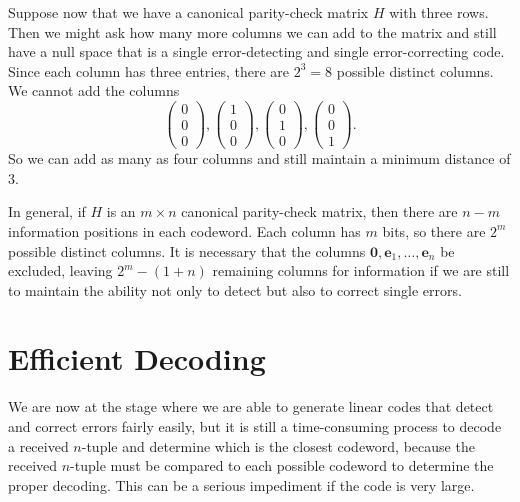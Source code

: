  
\medskip
 
 
Suppose now that we have a canonical parity-check matrix $H$ with
three rows. Then we might ask how many more columns we can add to
the matrix and still have a null space that is a single
error-detecting and single error-correcting code. Since each column
has three entries, there are $2^3 = 8$ possible distinct columns. We
cannot add the columns 
\[
\begin{pmatrix}
 0 \\ 0 \\ 0 
\end{pmatrix},
\begin{pmatrix}
 1 \\ 0 \\ 0 
\end{pmatrix},
\begin{pmatrix}
 0 \\ 1 \\ 0 
 \end{pmatrix},
\begin{pmatrix}
 0 \\ 0 \\ 1 
 \end{pmatrix}.
\]
So we can add as many as four columns and still maintain a minimum
distance of 3. 
 
 
In general, if $H$ is an $m \times n$ canonical parity-check matrix,
then there are $n-m$ information positions in each codeword. Each
column has $m$ bits, so there are $2^m$ possible distinct columns.
It is necessary that the columns ${\mathbf 0}, {\mathbf e}_1, \ldots,
{\mathbf e}_n$ be excluded, leaving $2^m - (1 + n)$ remaining columns for
information if we are still to maintain the ability not only to detect
but also to correct single errors. 
 
 
\section{Efficient Decoding}
 
 
We are now at the stage where we are able to generate linear codes
that detect and correct errors fairly easily, but it is still a 
time-consuming process to decode a received $n$-tuple and determine which
is the closest codeword, because the received $n$-tuple must be compared 
to each possible codeword to determine the proper decoding.
This can be a serious impediment if the code is very large.
 
